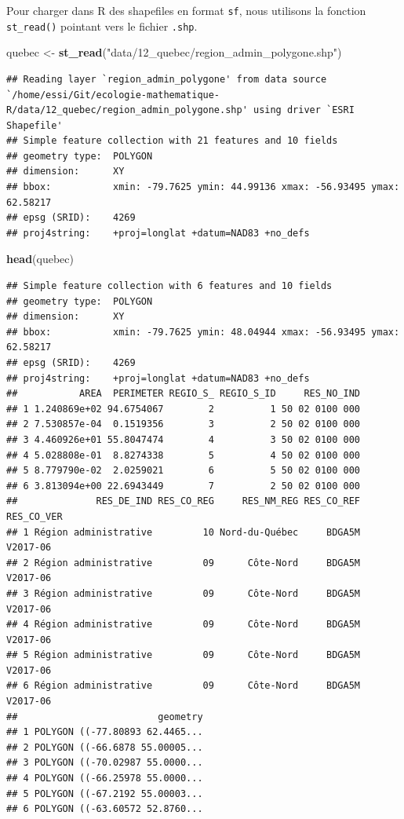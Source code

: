 \documentclass[]{book}
\newenvironment{Shaded}{\begin{snugshade}}{\end{snugshade}}
\newcommand{\KeywordTok}[1]{\textcolor[rgb]{0.13,0.29,0.53}{\textbf{#1}}}
\newcommand{\NormalTok}[1]{#1}
\newcommand{\StringTok}[1]{\textcolor[rgb]{0.31,0.60,0.02}{#1}}
\begin{document}
Pour charger dans R des shapefiles en format \texttt{sf}, nous utilisons
la fonction \texttt{st\_read()} pointant vers le fichier \texttt{.shp}.

\begin{Shaded}
\begin{Highlighting}[]
\NormalTok{quebec <-}\StringTok{ }\KeywordTok{st_read}\NormalTok{(}\StringTok{"data/12_quebec/region_admin_polygone.shp"}\NormalTok{)}
\end{Highlighting}
\end{Shaded}

\begin{verbatim}
## Reading layer `region_admin_polygone' from data source `/home/essi/Git/ecologie-mathematique-R/data/12_quebec/region_admin_polygone.shp' using driver `ESRI Shapefile'
## Simple feature collection with 21 features and 10 fields
## geometry type:  POLYGON
## dimension:      XY
## bbox:           xmin: -79.7625 ymin: 44.99136 xmax: -56.93495 ymax: 62.58217
## epsg (SRID):    4269
## proj4string:    +proj=longlat +datum=NAD83 +no_defs
\end{verbatim}

\begin{Shaded}
\begin{Highlighting}[]
\KeywordTok{head}\NormalTok{(quebec)}
\end{Highlighting}
\end{Shaded}

\begin{verbatim}
## Simple feature collection with 6 features and 10 fields
## geometry type:  POLYGON
## dimension:      XY
## bbox:           xmin: -79.7625 ymin: 48.04944 xmax: -56.93495 ymax: 62.58217
## epsg (SRID):    4269
## proj4string:    +proj=longlat +datum=NAD83 +no_defs
##           AREA  PERIMETER REGIO_S_ REGIO_S_ID     RES_NO_IND
## 1 1.240869e+02 94.6754067        2          1 50 02 0100 000
## 2 7.530857e-04  0.1519356        3          2 50 02 0100 000
## 3 4.460926e+01 55.8047474        4          3 50 02 0100 000
## 4 5.028808e-01  8.8274338        5          4 50 02 0100 000
## 5 8.779790e-02  2.0259021        6          5 50 02 0100 000
## 6 3.813094e+00 22.6943449        7          2 50 02 0100 000
##              RES_DE_IND RES_CO_REG     RES_NM_REG RES_CO_REF RES_CO_VER
## 1 Région administrative         10 Nord-du-Québec     BDGA5M   V2017-06
## 2 Région administrative         09      Côte-Nord     BDGA5M   V2017-06
## 3 Région administrative         09      Côte-Nord     BDGA5M   V2017-06
## 4 Région administrative         09      Côte-Nord     BDGA5M   V2017-06
## 5 Région administrative         09      Côte-Nord     BDGA5M   V2017-06
## 6 Région administrative         09      Côte-Nord     BDGA5M   V2017-06
##                         geometry
## 1 POLYGON ((-77.80893 62.4465...
## 2 POLYGON ((-66.6878 55.00005...
## 3 POLYGON ((-70.02987 55.0000...
## 4 POLYGON ((-66.25978 55.0000...
## 5 POLYGON ((-67.2192 55.00003...
## 6 POLYGON ((-63.60572 52.8760...
\end{verbatim}
\end{document}
